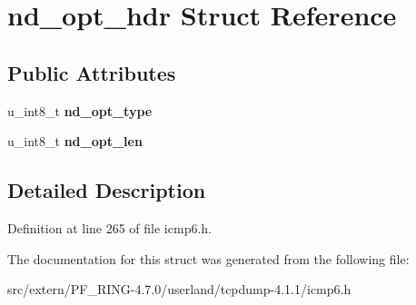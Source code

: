 \hypertarget{structnd__opt__hdr}{
\section{nd\_\-opt\_\-hdr Struct Reference}
\label{structnd__opt__hdr}
}
\subsection*{Public Attributes}
\begin{DoxyCompactItemize}
\item 
\hypertarget{structnd__opt__hdr_af88059e7f8e8f0518e498df1dbcde4d1}{
u\_\-int8\_\-t {\bfseries nd\_\-opt\_\-type}}
\label{structnd__opt__hdr_af88059e7f8e8f0518e498df1dbcde4d1}

\item 
\hypertarget{structnd__opt__hdr_a6427cd316d7cf9311c51548d30a27f78}{
u\_\-int8\_\-t {\bfseries nd\_\-opt\_\-len}}
\label{structnd__opt__hdr_a6427cd316d7cf9311c51548d30a27f78}

\end{DoxyCompactItemize}


\subsection{Detailed Description}


Definition at line 265 of file icmp6.h.



The documentation for this struct was generated from the following file:\begin{DoxyCompactItemize}
\item 
src/extern/PF\_\-RING-\/4.7.0/userland/tcpdump-\/4.1.1/icmp6.h\end{DoxyCompactItemize}
